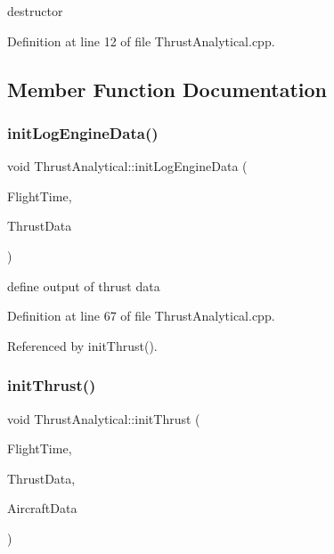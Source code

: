 destructor 



Definition at line 12 of file Thrust\+Analytical.\+cpp.



\subsection{Member Function Documentation}
\mbox{\label{class_thrust_analytical_ae1b4a04fe4f2a7dd41d6b845e5e36a92}} 
\subsubsection{\texorpdfstring{init\+Log\+Engine\+Data()}{initLogEngineData()}}
{\footnotesize\ttfamily void Thrust\+Analytical\+::init\+Log\+Engine\+Data (\begin{DoxyParamCaption}\item[{\hyperlink{group___tools_ga3f1431cb9f76da10f59246d1d743dc2c}{Float64} \&}]{Flight\+Time,  }\item[{Thrust\+Struct \&}]{Thrust\+Data }\end{DoxyParamCaption})}



define output of thrust data 



Definition at line 67 of file Thrust\+Analytical.\+cpp.



Referenced by init\+Thrust().

\mbox{\label{class_thrust_analytical_ad6d786911957c0d3105a938ff534600a}} 
\subsubsection{\texorpdfstring{init\+Thrust()}{initThrust()}}
{\footnotesize\ttfamily void Thrust\+Analytical\+::init\+Thrust (\begin{DoxyParamCaption}\item[{\hyperlink{group___tools_ga3f1431cb9f76da10f59246d1d743dc2c}{Float64} \&}]{Flight\+Time,  }\item[{Thrust\+Struct \&}]{Thrust\+Data,  }\item[{Aircraft\+Struct \&}]{Aircraft\+Data }\end{DoxyParamCaption})\hspace{0.3cm}{\ttfamily [virtual]}}



